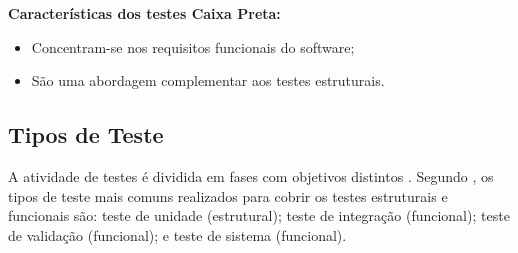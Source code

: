 \textbf{Características dos testes Caixa Preta:}

\begin{itemize}
    \item Concentram-se nos requisitos funcionais do software;
    \item São uma abordagem complementar aos testes estruturais.
\end{itemize}




\subsection{Tipos de Teste}


A atividade de testes é dividida em fases com objetivos distintos \cite{DELAMARO2007}. Segundo , os tipos de teste mais comuns realizados para cobrir os testes estruturais e funcionais são: teste de unidade (estrutural); teste de integração (funcional); teste de validação (funcional); e teste de sistema (funcional).

